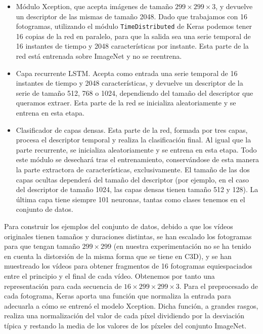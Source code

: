 \documentclass[../main.tex]{memoir}
\begin{document}
\begin{itemize}
\item Módulo Xception, que acepta imágenes de tamaño
  $299 \times 299 \times 3$, y devuelve un descriptor de las mismas de
  tamaño 2048. Dado que trabajamos con 16 fotogramas, utilizando el
  módulo \texttt{TimeDistributed} de Keras podemos tener 16 copias de
  la red en paralelo, para que la salida sea una serie temporal de 16
  instantes de tiempo y 2048 características por instante. Esta parte
  de la red está entrenada sobre ImageNet y no se reentrena.
\item Capa recurrente LSTM. Acepta como entrada una serie temporal de
  16 instantes de tiempo y 2048 características, y devuelve un
  descriptor de la serie de tamaño 512, 768 o 1024, dependiendo del
  tamaño del descriptor que queramos extraer. Esta parte de la red se
  inicializa aleatoriamente y se entrena en esta etapa.
\item Clasificador de capas densas. Esta parte de la red, formada por
  tres capas, procesa el descriptor temporal y realiza la
  clasificación final. Al igual que la parte recurrente, se inicializa
  aleatoriamente y se entrena en esta etapa. Todo este módulo se
  desechará tras el entrenamiento, conservándose de esta manera la
  parte extractora de características, exclusivamente. El tamaño de
  las dos capas ocultas dependerá del tamaño del descriptor (por
  ejemplo, en el caso del descriptor de tamaño 1024, las capas densas
  tienen tamaño 512 y 128). La última capa tiene siempre 101 neuronas,
  tantas como clases tenemos en el conjunto de datos.
\end{itemize}

Para construir los ejemplos del conjunto de datos, debido a que los
vídeos originales tienen tamaños y duraciones distintas, se han
escalado los fotogramas para que tengan tamaño $299 \times 299$ (en
nuestra experimentación no se ha tenido en cuenta la distorsión de la
misma forma que se tiene en C3D), y se han muestreado los vídeos para
obtener fragmentos de 16 fotogramas equiespaciados entre el principio
y el final de cada vídeo. Obtenemos por tanto una representación para
cada secuencia de $16 \times 299 \times 299 \times 3$. Para el
preprocesado de cada fotograma, Keras aporta una función que normaliza
la entrada para adecuarla a cómo se entrenó el modelo Xception. Dicha
función, a grandes rasgos, realiza una normalización del valor de cada
píxel dividiendo por la desviación típica y restando la media de los
valores de los píxeles del conjunto ImageNet.\\
\end{document}

